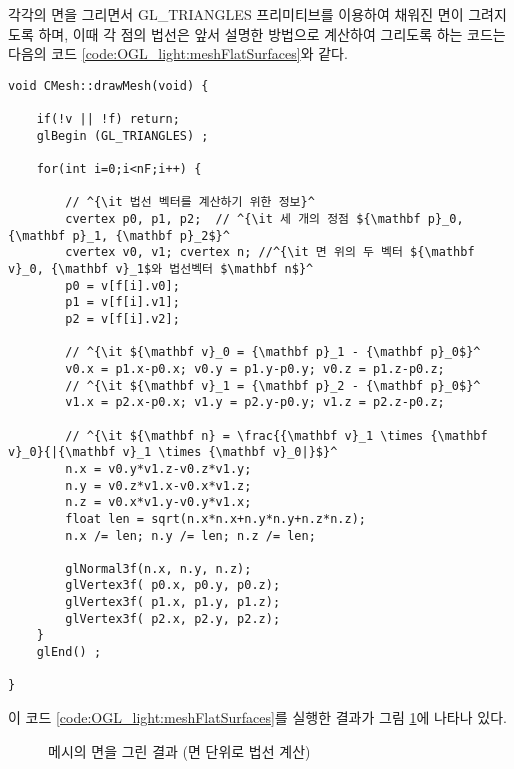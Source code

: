 각각의 면을 그리면서 {\sf GL\_TRIANGLES} 프리미티브를 이용하여 채워진 면이 그려지도록 하며, 
이때 각 점의 법선은 앞서 설명한 방법으로 계산하여 그리도록 하는 코드는 다음의 코드 \ref{code:OGL_light:meshFlatSurfaces}와 같다.

\begin{algorithmbis}\label{code:OGL_light:meshFlatSurfaces}
\lstset{language=C++, escapechar=^} 
\begin{lstlisting}
void CMesh::drawMesh(void) {

    if(!v || !f) return;
    glBegin (GL_TRIANGLES) ; 

    for(int i=0;i<nF;i++) {

        // ^{\it 법선 벡터를 계산하기 위한 정보}^
        cvertex p0, p1, p2;  // ^{\it 세 개의 정점 ${\mathbf p}_0, {\mathbf p}_1, {\mathbf p}_2$}^
        cvertex v0, v1; cvertex n; //^{\it 면 위의 두 벡터 ${\mathbf v}_0, {\mathbf v}_1$와 법선벡터 $\mathbf n$}^
        p0 = v[f[i].v0];
        p1 = v[f[i].v1];
        p2 = v[f[i].v2];

        // ^{\it ${\mathbf v}_0 = {\mathbf p}_1 - {\mathbf p}_0$}^
        v0.x = p1.x-p0.x; v0.y = p1.y-p0.y; v0.z = p1.z-p0.z; 
        // ^{\it ${\mathbf v}_1 = {\mathbf p}_2 - {\mathbf p}_0$}^
        v1.x = p2.x-p0.x; v1.y = p2.y-p0.y; v1.z = p2.z-p0.z;

        // ^{\it ${\mathbf n} = \frac{{\mathbf v}_1 \times {\mathbf v}_0}{|{\mathbf v}_1 \times {\mathbf v}_0|}$}^
        n.x = v0.y*v1.z-v0.z*v1.y;
        n.y = v0.z*v1.x-v0.x*v1.z;
        n.z = v0.x*v1.y-v0.y*v1.x;
        float len = sqrt(n.x*n.x+n.y*n.y+n.z*n.z); 
        n.x /= len; n.y /= len; n.z /= len;

        glNormal3f(n.x, n.y, n.z); 
        glVertex3f( p0.x, p0.y, p0.z); 
        glVertex3f( p1.x, p1.y, p1.z); 
        glVertex3f( p2.x, p2.y, p2.z);
    }
    glEnd() ;

}
\end{lstlisting}
\end{algorithmbis}

이 코드 \ref{code:OGL_light:meshFlatSurfaces}를 실행한 결과가
그림 \ref{fig:OGL_light:meshFlatSurfaces}에 나타나 있다.

\begin{figure}[h!]
  \centering
    \caption{메시의 면을 그린 결과 (면 단위로 법선 계산)}
    \label{fig:OGL_light:meshFlatSurfaces}
\end{figure}

